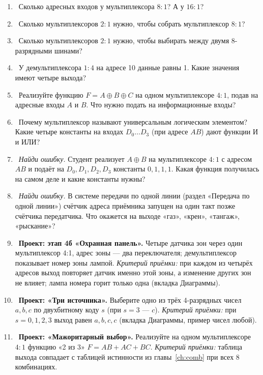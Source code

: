 \begin{taskbox}
\begin{enumerate}
  \item {}~Сколько адресных входов у мультиплексора $8:1$? А у $16:1$?
  \item {}~Сколько мультиплексоров $2:1$ нужно, чтобы собрать мультиплексор $8:1$?
  \item {}~Сколько мультиплексоров $2:1$ нужно, чтобы выбирать между двумя 8-разрядными шинами?
  \item {}~У демультиплексора $1:4$ на адресе 10 данные равны 1. Какие значения имеют четыре выхода?
  \item {}~Реализуйте функцию $F = A\oplus B\oplus C$ на одном мультиплексоре $4:1$, подав на адресные входы $A$ и $B$. Что нужно подать на информационные входы?
  \item {}~Почему мультиплексор называют универсальным логическим элементом? Какие четыре константы на входах $D_0\ldots D_3$ (при адресе $AB$) дают функции И и ИЛИ?
  \item {}~\emph{Найди ошибку.} Студент реализует $A\oplus B$ на мультиплексоре $4:1$ с адресом $AB$ и подаёт на $D_0,D_1,D_2,D_3$ константы $0,1,1,1$. Какая функция получилась на самом деле и какие константы нужны?
  \item {}~\emph{Найди ошибку.} В системе передачи по одной линии (раздел «Передача по одной линии») счётчик адреса приёмника запущен на один такт позже счётчика передатчика. Что окажется на выходе «газ», «крен», «тангаж», «рыскание»?
  \item {}~\textbf{Проект: этап 4б «Охранная панель».} Четыре датчика зон через один мультиплексор 4:1, адрес зоны --- два переключателя; демультиплексор показывает номер зоны лампой. \emph{Критерий приёмки:} при каждом из четырёх адресов выход повторяет датчик именно этой зоны, а изменение других зон не влияет; лампа номера горит только одна (вкладка Диаграммы).
  \item {}~\textbf{Проект: «Три источника».} Выберите одно из трёх 4-разрядных чисел $a,b,c$ по двухбитному коду $s$ (при $s=3$ --- $c$). \emph{Критерий приёмки:} при $s=0,1,2,3$ выход равен $a,b,c,c$ (вкладка Диаграммы, пример чисел любой).
  \item {}~\textbf{Проект: «Мажоритарный выбор».} Реализуйте на одном мультиплексоре $4:1$ функцию «2 из 3» $F=AB+AC+BC$. \emph{Критерий приёмки:} таблица выхода совпадает с таблицей истинности из главы~\ref{ch:comb} при всех 8 комбинациях.
\end{enumerate}
\end{taskbox}

